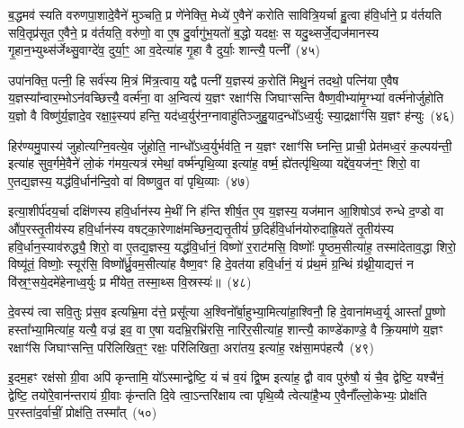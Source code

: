 {\anuvakamend[{वि॒त्त्वा दे॑वय॒त ए॒षाम॑ब्रुव॒न्॒ यानि॒ चतु॑श्चत्वारिꣳशच्च}]}

ब॒द्धमव॑ स्यति वरुणपा॒शादे॒वैने॑ मुञ्चति॒ प्र णे॑नेक्ति॒ मेध्ये॑ ए॒वैने॑ करोति सावित्रि॒यर्चा हु॒त्वा ह॑वि॒र्धाने॒ प्र व॑र्तयति सवि॒तृप्र॑सूत ए॒वैने॒ प्र व॑र्तयति॒ वरु॑णो॒ वा ए॒ष दु॒र्वागु॑भ॒यतो॑ ब॒द्धो यदक्षः॒ स यदु॒थ्सर्जे॒द्यज॑मानस्य गृ॒हान॒भ्युथ्स॑र्जेथ्सु॒वाग्दे॑व॒ दुर्या॒ꣳ॒ आ व॒देत्या॑ह गृ॒हा वै दुर्याः॒ शान्त्यै॒ पत्नी᳚~(४५)\ip

उपा॑नक्ति॒ पत्नी॒ हि सर्व॑स्य मि॒त्रं मि॑त्र॒त्वाय॒ यद्वै पत्नी॑ य॒ज्ञस्य॑ क॒रोति॑ मिथु॒नं तदथो॒ पत्नि॑या ए॒वैष य॒ज्ञस्या᳚न्वार॒म्भो\-ऽन॑वच्छित्त्यै॒ वर्त्म॑ना॒ वा अ॒न्वित्य॑ य॒ज्ञꣳ रक्षाꣳ॑सि जिघाꣳसन्ति वैष्ण॒वीभ्या॑मृ॒ग्भ्यां वर्त्म॑नोर्जुहोति य॒ज्ञो वै विष्णु॑र्य॒ज्ञादे॒व रक्षा॒ꣴ॒स्यप॑ हन्ति॒ यद॑ध्व॒र्युर॑न॒ग्नावाहु॑तिञ्जुहु॒याद॒न्धो᳚\-ऽध्व॒र्युः स्या॒द्रक्षाꣳ॑सि य॒ज्ञꣳ ह॑न्युः~(४६)\ip

हिर॑ण्यमु॒पास्य॑ जुहोत्यग्नि॒वत्ये॒व जु॑होति॒ नान्धो᳚\-ऽध्व॒र्युर्भव॑ति॒ न य॒ज्ञꣳ रक्षाꣳ॑सि घ्नन्ति॒ प्राची॒ प्रेत॑मध्व॒रं क॒ल्पय॑न्ती॒ इत्या॑ह सुव॒र्गमे॒वैने॑ लो॒कं ग॑मय॒त्यत्र॑ रमेथां॒ वर्ष्म॑न्पृथि॒व्या इत्या॑ह॒ वर्ष्म॒ ह्ये॑तत्पृ॑थि॒व्या यद्दे॑व॒यज॑न॒ꣳ॒ शिरो॒ वा ए॒तद्य॒ज्ञस्य॒ यद्ध॑वि॒र्धान॑न्दि॒वो वा॑ विष्णवु॒त वा॑ पृथि॒व्याः~(४७)\ip

इत्या॒शीर्प॑दय॒र्चा दक्षि॑णस्य हवि॒र्धान॑स्य मे॒थीं नि ह॑न्ति शीर्\mbox{}ष॒त ए॒व य॒ज्ञस्य॒ यज॑मान आ॒शिषो\-ऽव॑ रुन्धे द॒ण्डो वा औ॑प॒रस्तृ॒तीय॑स्य हवि॒र्धान॑स्य वषट्का॒रेणाक्ष॑मच्छिन॒द्यत्तृ॒तीयं॑ छ॒दिर्\mbox{}ह॑वि॒र्धान॑योरुदाह्रि॒यते॑ तृ॒तीय॑स्य हवि॒र्धान॒स्याव॑रुद्ध्यै॒ शिरो॒ वा ए॒तद्य॒ज्ञस्य॒ यद्ध॑वि॒र्धानं॒ विष्णो॑ र॒राट॑मसि॒ विष्णोः᳚ पृ॒ष्ठम॒सीत्या॑ह॒ तस्मा॑देताव॒द्धा शिरो॒ विष्यू॑तं॒ विष्णोः॒ स्यूर॑सि॒ विष्णो᳚र्ध्रु॒वम॒सीत्या॑ह वैष्ण॒वꣳ हि दे॒वत॑या हवि॒र्धानं॒ यं प्र॑थ॒मं ग्र॒न्थिं ग्र॑थ्नी॒याद्यत्तं न वि॑स्र॒ꣳ॒सये॒दमे॑हेनाध्व॒र्युः प्र मी॑येत॒ तस्मा॒थ्स वि॒स्रस्यः॑॥~(४८)\ip

{\anuvakamend[{पत्नी॑ हन्युर्वा पृथि॒व्या विष्यू॑तं॒ विष्णोः॒ षड्विꣳ॑शतिश्च}]}

दे॒वस्य॑ त्वा सवि॒तुः प्र॑स॒व इत्यभ्रि॒मा द॑त्ते॒ प्रसू᳚त्या अ॒श्विनो᳚र्बा॒हुभ्या॒मित्या॑हा॒श्विनौ॒ हि दे॒वाना॑मध्व॒र्यू आस्तां᳚ पू॒ष्णो हस्ता᳚भ्या॒मित्या॑ह॒ यत्यै॒ वज्र॑ इव॒ वा ए॒षा यदभ्रि॒रभ्रि॑रसि॒ नारि॑र॒सीत्या॑ह॒ शान्त्यै॒ काण्डे॑काण्डे॒ वै क्रि॒यमा॑णे य॒ज्ञꣳ रक्षाꣳ॑सि जिघाꣳसन्ति॒ परि॑लिखित॒ꣳ॒ रक्षः॒ परि॑लिखिता॒ अरा॑तय॒ इत्या॑ह॒ रक्ष॑सा॒मप॑हत्यै~(४९)\ip

इ॒दम॒हꣳ रक्ष॑सो ग्री॒वा अपि॑ कृन्तामि॒ यो᳚\-ऽस्मान्द्वेष्टि॒ यं च॑ व॒यं द्वि॒ष्म इत्या॑ह॒ द्वौ वाव पुरु॑षौ॒ यं चै॒व द्वेष्टि॒ यश्चै॑नं॒ द्वेष्टि॒ तयो॑रे॒वान॑न्तरायं ग्री॒वाः कृ॑न्तति दि॒वे त्वा॒ऽन्तरि॑क्षाय त्वा पृथि॒व्यै त्वेत्या॑है॒भ्य ए॒वैनाँ᳚ल्लो॒केभ्यः॒ प्रोक्ष॑ति प॒रस्ता॑द॒र्वाचीं॒ प्रोक्ष॑ति॒ तस्मा᳚त्~(५०)\ip

